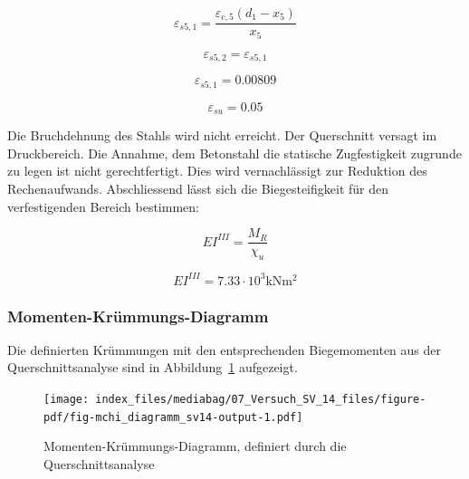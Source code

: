 \documentclass[
  12pt,
  letterpaper,
  egregdoesnotlikesansseriftitles]{scrreprt}
\begin{document}
\begin{equation}\varepsilon_{s5,1} = \frac{\varepsilon_{c,5} \left(d_{1} - x_{5}\right)}{x_{5}}\end{equation}

\begin{equation}\varepsilon_{s5,2} = \varepsilon_{s5,1}\end{equation}

\begin{equation}\varepsilon_{s5,1} = 0.00809\end{equation}

\begin{equation}\varepsilon_{su} = 0.05\end{equation}

Die Bruchdehnung des Stahls wird nicht erreicht. Der Querschnitt versagt
im Druckbereich. Die Annahme, dem Betonstahl die statische Zugfestigkeit
zugrunde zu legen ist nicht gerechtfertigt. Dies wird vernachlässigt zur
Reduktion des Rechenaufwands. Abschliessend lässt sich die
Biegesteifigkeit für den verfestigenden Bereich bestimmen:

\begin{equation}EI^{III} = \frac{M_{R}}{\chi_{u}}\end{equation}

\begin{equation}EI^{III} = 7.33 \cdot 10^{3} \text{kN} \text{m}^{2}\end{equation}

\hypertarget{momenten-kruxfcmmungs-diagramm-1}{%
\subsubsection{Momenten-Krümmungs-Diagramm}\label{momenten-kruxfcmmungs-diagramm-1}}

Die definierten Krümmungen mit den entsprechenden Biegemomenten aus der
Querschnittsanalyse sind in Abbildung~\ref{fig-mchi_diagramm_sv14}
aufgezeigt.

\begin{figure}[H]

{\centering \texttt{[image: index\_files/mediabag/07\_Versuch\_SV\_14\_files/figure-pdf/fig-mchi\_diagramm\_sv14-output-1.pdf]}

}

\caption{\label{fig-mchi_diagramm_sv14}Momenten-Krümmungs-Diagramm,
definiert durch die Querschnittsanalyse}

\end{figure}
\end{document}
